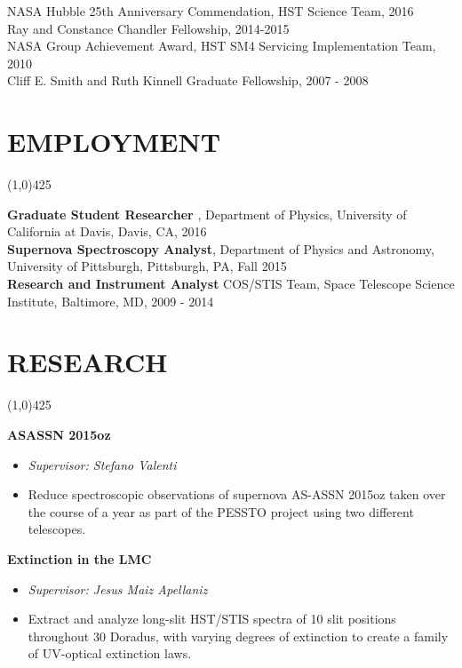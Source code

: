 \documentclass{res}
\begin{document}
\begin{resume}
NASA Hubble 25th Anniversary Commendation, HST Science Team, 2016 \\ %
Ray and Constance Chandler Fellowship, 2014-2015 \\
NASA Group Achievement Award, HST SM4 Servicing Implementation Team, 2010 \\
Cliff E. Smith and Ruth Kinnell Graduate Fellowship, 2007 - 2008 \\
 
\section{EMPLOYMENT}
\vspace{-.2in} 
\begin{center}
\line(1,0){425}
\end{center}
\vspace{-.3in} 
\vspace{0.1in} 

    {\bf Graduate Student Researcher} , Department of Physics, University of California at Davis, Davis, CA, 2016 \\
    {\bf Supernova Spectroscopy Analyst}, Department of Physics and Astronomy, University of Pittsburgh, Pittsburgh, PA, Fall 2015 \\
    {\bf Research and Instrument Analyst} COS/STIS Team, Space Telescope Science Institute, Baltimore, MD, 2009 - 2014 \\   
    
\section{RESEARCH} 
\vspace{-.2in}
\begin{center}
\line(1,0){425}
\end{center}
\vspace{-.3in}
\vspace{0.1in}

{\bf ASASSN 2015oz}
    \begin{itemize}
    \item[] \emph{Supervisor: Stefano Valenti}
    \item[] Reduce spectroscopic observations of supernova AS-ASSN 2015oz taken over the course of a year as part of the PESSTO project using two different telescopes.
        \end{itemize}
{\bf Extinction in the LMC}
     \begin{itemize}
    \item[] \emph{Supervisor: Jesus Maiz Apellaniz}
    \item[] Extract and analyze long-slit HST/STIS spectra of 10 slit positions throughout 30 Doradus, with varying degrees of extinction to create a family of UV-optical extinction laws. 
    \end{itemize}  


\end{resume}
\end{document}
